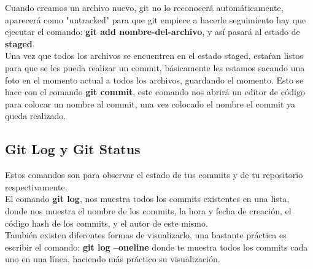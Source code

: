 \documentclass[13pt]{article}
\begin{document}
Cuando creamos un archivo nuevo, git no lo reconocerá automáticamente, aparecerá como "untracked" para que git empiece a hacerle seguimiento hay que ejecutar el comando: \textbf{git add nombre-del-archivo}, y así pasará al estado de \textbf{staged}.\\

Una vez que todos los archivos se encuentren en el estado staged, estaŕan listos para que se les pueda realizar un commit, básicamente les estamos sacando una foto en el momento actual a todos los archivos, guardando el momento. Esto se hace con el comando \textbf{git commit}, este comando nos abrirá un editor de código para colocar un nombre al commit, una vez colocado el nombre el commit ya queda realizado.

\subsection{Git Log y Git Status}
Estos comandos son para observar el estado de tus commits y de tu repositorio respectivamente.\\

El comando \textbf{git log}, nos muestra todos los commits existentes en una lista, donde nos muestra el nombre de los commits, la hora y fecha de creación, el código hash de los commits, y el autor de este mismo.\\
También existen diferentes formas de visualizarlo, una bastante práctica es escribir el comando: \textbf{git log --oneline} donde te muestra todos los commits cada uno en una línea, haciendo más práctico su visualización.
\end{document}
